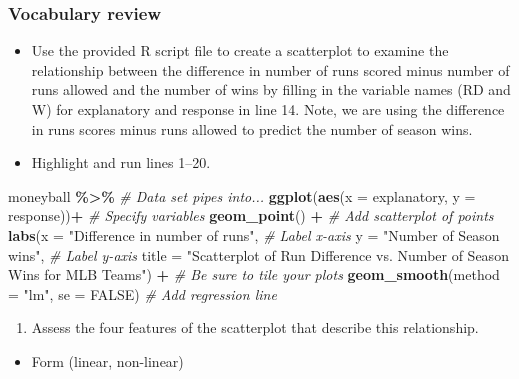 \documentclass[
]{report}
\newenvironment{Shaded}{\begin{snugshade}}{\end{snugshade}}
\newcommand{\AttributeTok}[1]{\textcolor[rgb]{0.13,0.29,0.53}{#1}}
\newcommand{\CommentTok}[1]{\textcolor[rgb]{0.56,0.35,0.01}{\textit{#1}}}
\newcommand{\ConstantTok}[1]{\textcolor[rgb]{0.56,0.35,0.01}{#1}}
\newcommand{\FunctionTok}[1]{\textcolor[rgb]{0.13,0.29,0.53}{\textbf{#1}}}
\newcommand{\NormalTok}[1]{#1}
\newcommand{\SpecialCharTok}[1]{\textcolor[rgb]{0.81,0.36,0.00}{\textbf{#1}}}
\newcommand{\StringTok}[1]{\textcolor[rgb]{0.31,0.60,0.02}{#1}}
\providecommand{\tightlist}{%
  \setlength{\itemsep}{0pt}\setlength{\parskip}{0pt}}
\begin{document}
\subsubsection*{Vocabulary review}\label{vocabulary-review}

\begin{itemize}
\item
  Use the provided R script file to create a scatterplot to examine the relationship between the difference in number of runs scored minus number of runs allowed and the number of wins by filling in the variable names (RD and W) for explanatory and response in line 14. Note, we are using the difference in runs scores minus runs allowed to predict the number of season wins.
\item
  Highlight and run lines 1--20.
\end{itemize}

\begin{Shaded}
\begin{Highlighting}[]
\NormalTok{moneyball }\SpecialCharTok{\%\textgreater{}\%} \CommentTok{\# Data set pipes into...}
    \FunctionTok{ggplot}\NormalTok{(}\FunctionTok{aes}\NormalTok{(}\AttributeTok{x =}\NormalTok{ explanatory, }\AttributeTok{y =}\NormalTok{ response))}\SpecialCharTok{+} \CommentTok{\# Specify variables}
    \FunctionTok{geom\_point}\NormalTok{() }\SpecialCharTok{+} \CommentTok{\# Add scatterplot of points}
    \FunctionTok{labs}\NormalTok{(}\AttributeTok{x =} \StringTok{"Difference in number of runs"}\NormalTok{, }\CommentTok{\# Label x{-}axis}
         \AttributeTok{y =} \StringTok{"Number of Season wins"}\NormalTok{, }\CommentTok{\# Label y{-}axis}
         \AttributeTok{title =} \StringTok{"Scatterplot of Run Difference vs. Number of Season Wins for MLB Teams"}\NormalTok{) }\SpecialCharTok{+}
\CommentTok{\# Be sure to tile your plots}
\FunctionTok{geom\_smooth}\NormalTok{(}\AttributeTok{method =} \StringTok{"lm"}\NormalTok{, }\AttributeTok{se =} \ConstantTok{FALSE}\NormalTok{) }\CommentTok{\# Add regression line}
\end{Highlighting}
\end{Shaded}

\begin{enumerate}
\def\labelenumi{\arabic{enumi}.}
\tightlist
\item
  Assess the four features of the scatterplot that describe this relationship.
\end{enumerate}

\begin{itemize}
\tightlist
\item
  Form (linear, non-linear)
\end{itemize}
\end{document}
